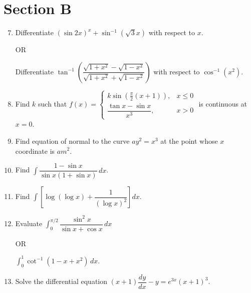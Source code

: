 \documentclass[12pt]{article}
\begin{document}
\section*{Section B}

\begin{enumerate}
    \setcounter{enumi}{6} %

    \item Differentiate $(\sin 2x)^x + \sin^{-1}(\sqrt{3}x)$ with respect to $x$.  

    OR  

    Differentiate $\tan^{-1}\left(\dfrac{\sqrt{1+x^2}-\sqrt{1-x^2}}{\sqrt{1+x^2}+\sqrt{1-x^2}}\right)$ with respect to $\cos^{-1}(x^2)$.

    \item Find $k$ such that $f(x)=\begin{cases} 
    k\sin\left(\tfrac{\pi}{2}(x+1)\right), & x\leq 0 \\ 
    \dfrac{\tan x-\sin x}{x^3}, & x>0 
    \end{cases}$ is continuous at $x=0$.

    \item Find equation of normal to the curve $ay^2=x^3$ at the point whose $x$ coordinate is $am^2$.

    \item Find $\int \dfrac{1-\sin x}{\sin x(1+\sin x)} \, dx$.

    \item Find $\int \left[\log(\log x)+\dfrac{1}{(\log x)^2}\right] dx$.

    \item Evaluate $\int_{0}^{\pi/2} \dfrac{\sin^2 x}{\sin x + \cos x} \, dx$  

    OR  

    $\int_{0}^{1} \cot^{-1}(1-x+x^2) \, dx$.

    \item Solve the differential equation $(x+1)\dfrac{dy}{dx} - y = e^{3x}(x+1)^3$.
\end{enumerate}
\end{document}
